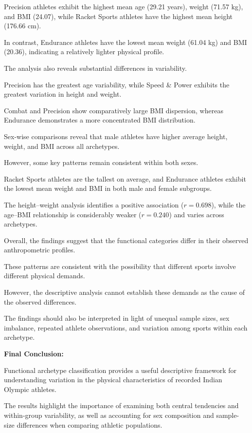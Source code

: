 \documentclass[11pt,a4paper]{article}
\begin{document}
Precision athletes exhibit the highest mean
age (29.21 years), weight (71.57 kg),
and BMI (24.07), while Racket Sports athletes
have the highest mean height (176.66 cm).

In contrast, Endurance athletes have the
lowest mean weight (61.04 kg) and BMI (20.36),
indicating a relatively lighter physical profile.

The analysis also reveals substantial differences
in variability.

Precision has the greatest age variability,
while Speed \& Power exhibits the greatest
variation in height and weight.

Combat and Precision show comparatively
large BMI dispersion, whereas Endurance
demonstrates a more concentrated BMI
distribution.

Sex-wise comparisons reveal that male
athletes have higher average height,
weight, and BMI across all archetypes.

However, some key patterns remain consistent
within both sexes.

Racket Sports athletes are the tallest
on average, and Endurance athletes exhibit
the lowest mean weight and BMI in both
male and female subgroups.

The height--weight analysis identifies a
positive association ($r = 0.698$),
while the age--BMI relationship is considerably
weaker ($r = 0.240$) and varies across
archetypes.

Overall, the findings suggest that the
functional categories differ in their
observed anthropometric profiles.

These patterns are consistent with the
possibility that different sports involve
different physical demands.

However, the descriptive analysis cannot
establish these demands as the cause of
the observed differences.

The findings should also be interpreted
in light of unequal sample sizes, sex
imbalance, repeated athlete observations,
and variation among sports within each
archetype.

\bigskip

\noindent
\textbf{Final Conclusion:}

Functional archetype classification provides
a useful descriptive framework for understanding
variation in the physical characteristics
of recorded Indian Olympic athletes.

The results highlight the importance of
examining both central tendencies and
within-group variability, as well as
accounting for sex composition and
sample-size differences when comparing
athletic populations.
\end{document}
